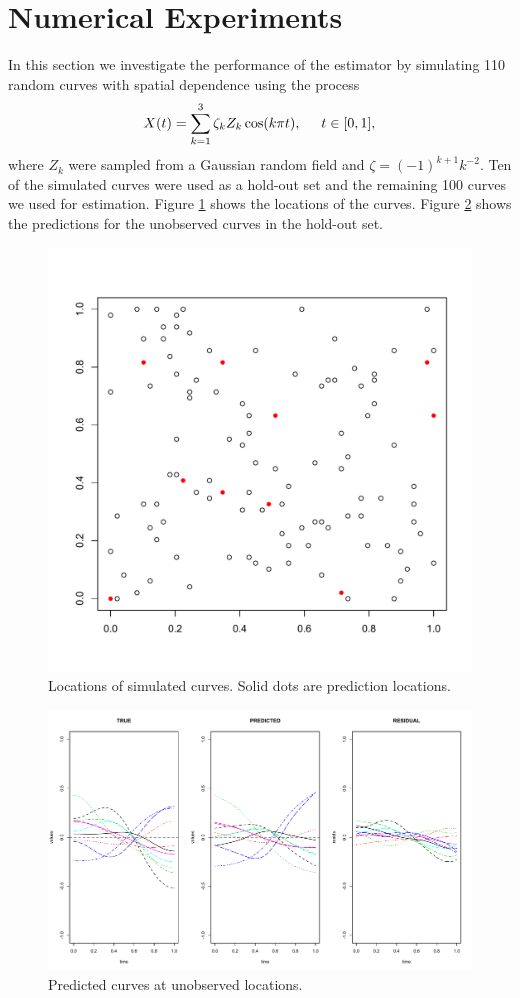 
\section{Numerical Experiments} 

\label{sec:numerical_experiments}

In this section we investigate the performance of the estimator by simulating 110 random curves with spatial dependence using the process 
\begin{equation}
	X(t) = \sum^{3}_{k=1}\zeta_k Z_k \cos(k\pi t), \hspace{0.5cm} t \in [0,1], \label{eq:sim process2} 
\end{equation}
where $Z_k$ were sampled from a Gaussian random field and \(\zeta=(-1)^{k+1}k^{-2}\). Ten of the simulated curves were used as a hold-out set and the remaining 100 curves we used for estimation. Figure \ref{fig:locations} shows the locations of the curves. Figure \ref{fig:curve kriging predictions} shows the predictions for the unobserved curves in the hold-out set. 
\begin{figure}
	\begin{center}
		\includegraphics[width=0.5
		\textwidth]{images/kriging/locations.pdf} 
	\end{center}
	\caption{Locations of simulated curves. Solid dots are prediction locations.} \label{fig:locations} 
\end{figure}
\begin{figure}
	\begin{center}
		\includegraphics[width=0.6
		\textwidth]{images/kriging/residual-curves.pdf} 
	\end{center}
	\caption{Predicted curves at unobserved locations. } \label{fig:curve kriging predictions} 
\end{figure}

